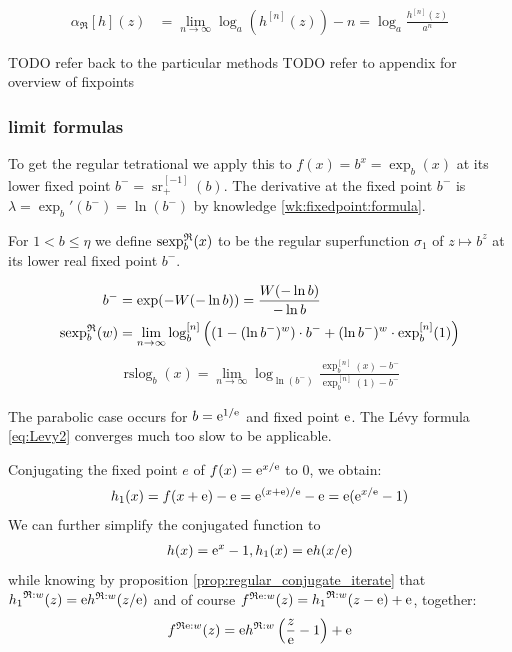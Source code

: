 \documentclass{article}
\numberwithin{equation}{section}
\begin{document}
\begin{align*}
  \alpha_{\mathfrak{R}}[h](z) &= \lim_{n\to\infty} \log_a(h^{[n]}(z)) - n
  = \log_a\frac{h^{[n]}(z)}{a^n}
\end{align*}

TODO refer back to the particular methods
TODO refer to appendix for overview of fixpoints
\newcommand{\sfrt}{\operatorname{sr}}
\subsubsection{limit formulas}
To get the regular tetrational we apply this to $f(x)=b^x=\exp_b(x)$
at its lower fixed point $b^-=\sfrt^{[-1]}_+(b)$. The
derivative at the fixed point $b^-$ is $\lambda=\exp_b'(b^-)=\ln(b^-)$
by knowledge \ref{wk:fixedpoint:formula}.
\begin{definition}
  For $1<b\le \eta$ we define $\operatorname{sexp}^{\mathfrak{R}}_b(x)$ to be the regular
  superfunction $\sigma_1$ of $z\mapsto b^z$ at its lower real fixed
  point $b^-$.
\end{definition}

\begin{align}
  b^-&=\exp(-W(-\ln b))=\frac{W(-\ln b)}{-\ln b}\\
  \operatorname{sexp}^{\mathfrak{R}}_b(w)&=\lim_{n\to\infty}
  \log_b^{[n]}\left((1-(\ln b^-)^{w})\cdot b^-+(\ln b^-)^{w}\cdot \exp_b^{[n]}(1)\right)
\end{align}
\begin{align}
  \operatorname{rslog}_b(x)=\lim_{n\to\infty} \log_{\ln(b^-)} \frac{\exp_b^{[n]}(x)-b^-}{\exp_b^{[n]}(1)-b^-}
\end{align}  

The parabolic case occurs for $b=\mathrm{e}^{1/\mathrm{e}}$ and fixed point $\mathrm{e}$. The Lévy formula
\eqref{eq:Levy2} converges much too slow to be applicable. 

Conjugating the fixed point $e$ of $f(x)=\mathrm{e}^{x/\mathrm{e}}$ to 0, we obtain:
\begin{align*}
  h_1(x)=f(x+\mathrm{e})-\mathrm{e}=\mathrm{e}^{(x+\mathrm{e})/\mathrm{e}}-\mathrm{e}=\mathrm{e}(\mathrm{e}^{x/\mathrm{e}} -1)
\end{align*}
We can further simplify the conjugated function to
\begin{align*}
  h(x)=\mathrm{e}^x-1, h_1(x)=\mathrm{e} h(x/\mathrm{e})
\end{align*}
while knowing by proposition \ref{prop:regular_conjugate_iterate} that
${h_1}^{\mathfrak{R}:w}(z)=\mathrm{e}{h}^{\mathfrak{R}:w}(z/\mathrm{e})$ and of course
${f}^{\mathfrak{R}\mathrm{e}:w}(z)={h_1}^{\mathfrak{R}:w}(z-\mathrm{e})+\mathrm{e}$, together:
\begin{align*}
  {f}^{\mathfrak{R}\mathrm{e}:w}(z)=\mathrm{e}{h}^{\mathfrak{R}:w}\left(\frac{z}{\mathrm{e}}-1\right)+\mathrm{e}
\end{align*}
\end{document}
